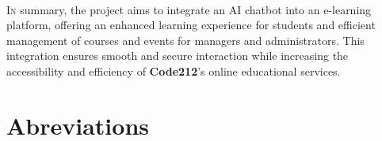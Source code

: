 \documentclass[a4paper, 11pt, openany]{report}
\begin{document}
\ \\

\lettrine[nindent=0em, slope=-.5em]{\color{Eblue}I}{n} summary, the project aims to integrate an AI chatbot into an e-learning platform, offering an enhanced learning experience for students and efficient management of courses and events for managers and administrators. This integration ensures smooth and secure interaction while increasing the accessibility and efficiency of \textbf{Code212}'s online educational services.
\newpage

\tableofcontents
\listoffigures
\listoftables



\newpage
\chapter*{Abreviations}
\end{document}
